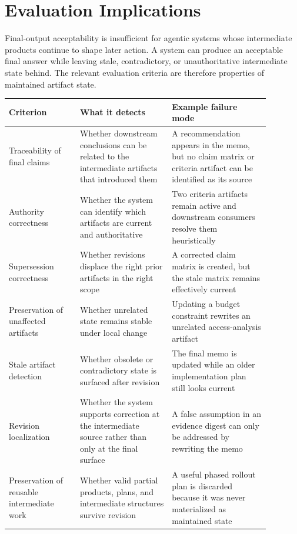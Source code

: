 \documentclass{article}
\begin{document}
\section{Evaluation Implications}

Final-output acceptability is insufficient for agentic systems whose intermediate products continue to shape later action. A system can produce an acceptable final answer while leaving stale, contradictory, or unauthoritative intermediate state behind. The relevant evaluation criteria are therefore properties of maintained artifact state.

\begin{table}[H]
\centering
\small
\begin{tabular}{p{0.24\linewidth}p{0.31\linewidth}p{0.33\linewidth}}
\toprule
Criterion & What it detects & Example failure mode \\
\midrule
Traceability of final claims & Whether downstream conclusions can be related to the intermediate artifacts that introduced them & A recommendation appears in the memo, but no claim matrix or criteria artifact can be identified as its source \\
Authority correctness & Whether the system can identify which artifacts are current and authoritative & Two criteria artifacts remain active and downstream consumers resolve them heuristically \\
Supersession correctness & Whether revisions displace the right prior artifacts in the right scope & A corrected claim matrix is created, but the stale matrix remains effectively current \\
Preservation of unaffected artifacts & Whether unrelated state remains stable under local change & Updating a budget constraint rewrites an unrelated access-analysis artifact \\
Stale artifact detection & Whether obsolete or contradictory state is surfaced after revision & The final memo is updated while an older implementation plan still looks current \\
Revision localization & Whether the system supports correction at the intermediate source rather than only at the final surface & A false assumption in an evidence digest can only be addressed by rewriting the memo \\
Preservation of reusable intermediate work & Whether valid partial products, plans, and intermediate structures survive revision & A useful phased rollout plan is discarded because it was never materialized as maintained state \\

\end{tabular}
\end{table}
\end{document}

